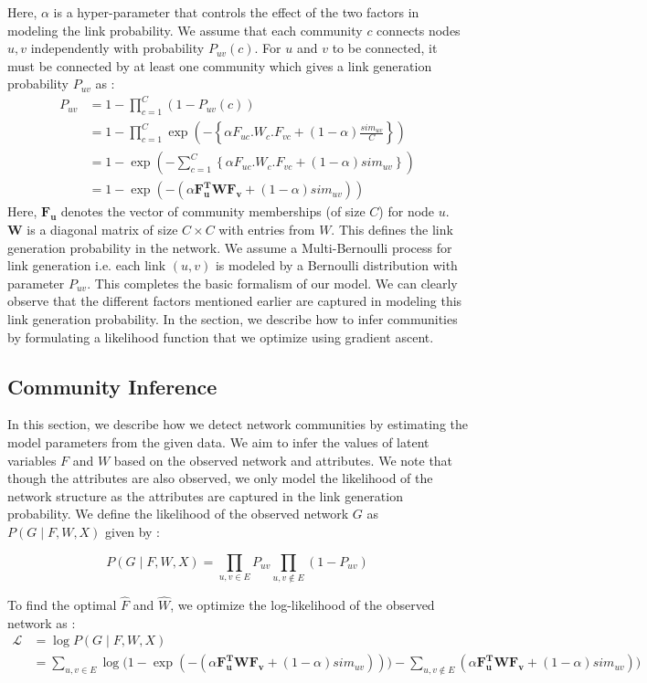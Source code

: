 \documentclass[11pt]{article}
\begin{document}
Here, $\alpha$ is a hyper-parameter that controls the effect of the two factors in modeling the link probability. We assume that each community $c$ connects nodes $u,v$ independently with probability $P_{uv} (c)$.  For $u$ and $v$ to be connected, it must be connected by at least one community which gives a link generation probability $P_{uv}$ as : 
\begin{align*}
P_{uv} &=  1 - \prod_{c=1}^C (1 - P_{uv}(c) )  \\
 &=1 - \prod_{c=1}^C \exp(- \left\lbrace \alpha F_{uc}. W_c. F_{vc} + (1 - \alpha) \frac{sim_{uv}}{C} \right\rbrace ) \\
 &= 1 - \exp( -\sum\limits_{c=1}^C \left\lbrace \alpha F_{uc}. W_c. F_{vc} + (1 - \alpha) sim_{uv} \right\rbrace)  \\
 &= 1 - \exp( - ( \alpha \mathbf{F_u^{T}} \mathbf{W} \mathbf{F_v} + (1 - \alpha) sim_{uv}))
\end{align*}
Here, $\mathbf{F_u}$ denotes the vector of community memberships (of size $C$) for node $u$. $\mathbf{W}$ is a diagonal matrix of size $C \times C$ with entries from $W$.
This defines the link generation probability in the network. We assume a Multi-Bernoulli process for link generation i.e. each link $(u,v)$ is modeled by a Bernoulli distribution with parameter $P_{uv}$.  This completes the basic formalism of our model. We can clearly observe that the different factors mentioned earlier are captured in modeling this link generation probability. In the section, we describe how to infer communities by formulating a likelihood function that we optimize using gradient ascent. 

\subsection{Community Inference}
In this section, we describe how we detect network communities by estimating the model parameters from the given data. We aim to infer the values of latent variables $F$ and $W$ based on the observed network and attributes. We note that though the attributes are also observed, we only model the likelihood of the network structure as the attributes are captured in the link generation probability. 
We define the likelihood of the observed network $G$ as  $P(G \mid F, W, X)$ given by : 

\[ P(G \mid F, W, X)  = \prod_{u, v \in E} P_{uv} \prod_{u,v \notin E} (1 - P_{uv}) \]

To find the optimal $\hat{F}$ and $\hat{W}$,  we optimize the log-likelihood of the observed network as : 
\begin{align*}
 \mathcal{L}  &= \log P(G \mid F, W, X)  \\
 &= \sum\limits_{u,v \in E} \log \Big( 1 - \exp( - ( \alpha \mathbf{F_u^{T}} \mathbf{W} \mathbf{F_v} + (1 - \alpha) sim_{uv})) \Big) - \sum\limits_{u, v \notin E} ( \alpha \mathbf{F_u^{T}} \mathbf{W} \mathbf{F_v} + (1 - \alpha) sim_{uv})) \\
\end{align*}
\end{document}
